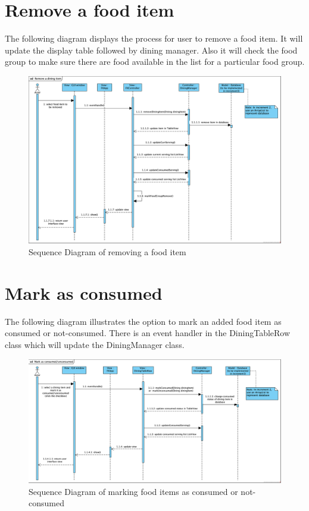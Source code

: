 \documentclass{scrreprt}
\begin{document}
\FloatBarrier

\newpage

\section{Remove a food item}

The following diagram displays the process for user to remove a food item. It will update the display table followed by dining manager. Also it will check the food group to make sure there are food available in the list for a particular food group.
\begin{figure}[!htbp]
\centering
\includegraphics[width=17.5cm]{pictures/sd-removeItem.png}
\caption{Sequence Diagram of removing a food item}
\end{figure}

\FloatBarrier

\newpage

\section{Mark as consumed}

The following diagram illustrates the option to mark an added food item as consumed or not-consumed. There is an event handler in the DiningTableRow class which will update the DiningManager class.

\begin{figure}[!htbp]
\centering
\includegraphics[width=17.5cm]{pictures/sd-markConsumed.png}
\caption{Sequence Diagram of marking food items as consumed or not-consumed}
\end{figure}
\end{document}
